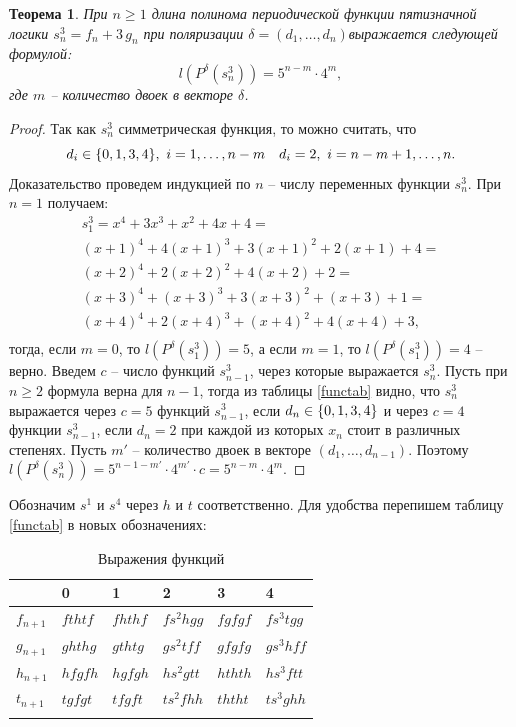 \documentclass[bibliography=totoc, a4paper, 14pt]{extarticle}
\newtheorem{myth}{Теорема}
\def\in{\mathchar"3232\nobreak\discretionary{}{\usefont{OMS}{cmsy}{m}{n}\char50}{}}
\begin{document}
\begin{myth}
\label{ths3}
При $n \geqslant 1$ длина полинома периодической функции пятизначной логики ${s^3_n = f_n + 3\,g_n}$
при поляризации $\delta = (d_1,\ldots,d_n)$выражается следующей формулой:
$$ l(P^{\delta}(s^3_n)) = 5^{n-m} \cdot 4^m ,$$
где $m$ -- количество двоек в векторе $\delta$.
\end{myth}
\begin{proof}
Так как $s^3_n$ симметрическая функция, то можно считать, что
$$d_i \in \{0,1,3,4\},\ i=1,\dots,n-m \quad d_i = 2,\ i=n-m+1,\dots,n.$$
Доказательство проведем индукцией по $n$ -- числу переменных функции $s^3_n$.
При $n = 1$ получаем:
$$ \begin{array}{l}
s^3_1 = x^4 + 3x^3 + x^2 + 4x + 4 = \\
(x+1)^4 + 4(x+1)^3 + 3(x+1)^2 + 2(x+1) + 4 = \\
(x+2)^4 + 2(x+2)^2 + 4(x+2) + 2 = \\
(x+3)^4 + (x+3)^3 + 3(x+3)^2 + (x+3) + 1 = \\
(x+4)^4 + 2(x+4)^3 + (x+4)^2 + 4(x+4) + 3, \\
\end{array}$$
тогда, если $m=0$, то $l(P^{\delta}(s^3_1)) = 5$, а если $m=1$, то
$l(P^{\delta}(s^3_1))=4$ -- верно. Введем $c$ -- число функций $s^3_{n-1}$, через которые
выражается $s^3_n$. Пусть при $n \geqslant 2$ формула верна для ${n-1}$, тогда из таблицы \ref{functab} видно, что
$s^3_n$ выражается через $c=5$ функций $s^3_{n-1}$, если ${d_n \in \{0,1,3,4\}}$ и через $c=4$
функции $s^3_{n-1}$, если $d_n = 2$ при каждой из которых $x_n$ стоит в различных степенях.
Пусть $m'$ -- количество двоек в векторе $(d_1,\dots,d_{n-1})$.
Поэтому ${l(P^{\delta}(s^3_n)) = 5^{n-1-m'} \cdot 4^{m'} \cdot c = 5^{n-m}\cdot4^m}$.
\end{proof}



Обозначим $s^1$ и $s^4$ через $h$ и $t$ соответственно.
Для удобства перепишем таблицу \ref{functab} в новых обозначениях:

\begin{center}
\begin{longtable}{| l | l | l | l | l | l |}

\hline & 0 & 1 & 2 & 3 & 4 \\
\hline

$f_{n+1}$ & $f t h t f$ & $f h t h f$ & $f s^2 h g g$ & $f g f g f$ & $f s^3 t g g$
\\ \hline

$g_{n+1}$ & $g h t h g$ & $g t h t g$ & $g s^2 t f f$ & $g f g f g$ & $g s^3 h f f$
\\ \hline

$h_{n+1}$ & $h f g f h$ & $h g f g h$ & $h s^2 g t t$ & $h t h t h$ & $h s^3 f t t$
\\ \hline

$t_{n+1}$ & $t g f g t$ & $t f g f t$ & $t s^2 f h h$ & $t h t h t$ & $t s^3 g h h$
\\ \hline

\caption{Выражения функций}
\label{functab2}
\end{longtable}
\end{center}
\end{document}
